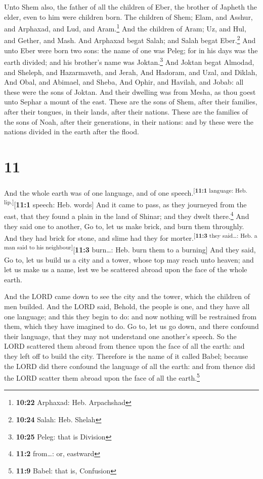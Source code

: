  Unto Shem also, the father of all the children of Eber,
the brother of Japheth the elder, even to him were children born.
 The children of Shem; Elam, and Asshur, and Arphaxad,
and Lud, and Aram.\footnote{\textbf{10:22} Arphaxad: Heb. Arpachshad}
 And the children of Aram; Uz, and Hul, and Gether, and
Mash.  And Arphaxad begat Salah; and Salah begat
Eber.\footnote{\textbf{10:24} Salah: Heb. Shelah}  And
unto Eber were born two sons: the name of one was Peleg; for in his days
was the earth divided; and his brother's name was Joktan.\footnote{\textbf{10:25}
  Peleg: that is Division}  And Joktan begat Almodad, and
Sheleph, and Hazarmaveth, and Jerah,  And Hadoram, and
Uzal, and Diklah,  And Obal, and Abimael, and Sheba,
 And Ophir, and Havilah, and Jobab: all these were the
sons of Joktan.  And their dwelling was from Mesha, as
thou goest unto Sephar a mount of the east.  These are
the sons of Shem, after their families, after their tongues, in their
lands, after their nations.  These are the families of
the sons of Noah, after their generations, in their nations: and by
these were the nations divided in the earth after the flood.

\hypertarget{section-10}{%
\section{11}\label{section-10}}

 And the whole earth was of one language, and of one
speech.\textsuperscript{{[}\textbf{11:1} language: Heb.
lip.{]}}{[}\textbf{11:1} speech: Heb. words{]}  And it
came to pass, as they journeyed from the east, that they found a plain
in the land of Shinar; and they dwelt there.\footnote{\textbf{11:2}
  from\ldots: or, eastward}  And they said one to another,
Go to, let us make brick, and burn them throughly. And they had brick
for stone, and slime had they for
morter.\textsuperscript{{[}\textbf{11:3} they said\ldots: Heb. a man
said to his neighbour{]}}{[}\textbf{11:3} burn\ldots: Heb. burn them to
a burning{]}  And they said, Go to, let us build us a city
and a tower, whose top may reach unto heaven; and let us make us a name,
lest we be scattered abroad upon the face of the whole earth.

 And the LORD came down to see the city and the tower,
which the children of men builded.  And the LORD said,
Behold, the people is one, and they have all one language; and this they
begin to do: and now nothing will be restrained from them, which they
have imagined to do.  Go to, let us go down, and there
confound their language, that they may not understand one another's
speech.  So the LORD scattered them abroad from thence
upon the face of all the earth: and they left off to build the city.
 Therefore is the name of it called Babel; because the
LORD did there confound the language of all the earth: and from thence
did the LORD scatter them abroad upon the face of all the
earth.\footnote{\textbf{11:9} Babel: that is, Confusion}

